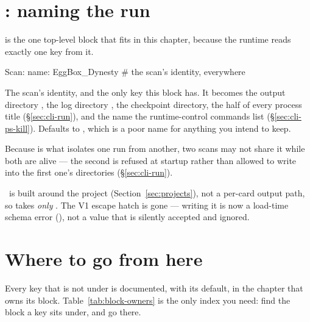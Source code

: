 \section{: naming the run}
\label{sec:scan-block}

 is the one top-level block that fits in this chapter, because the runtime
reads exactly one key from it.

\begin{yamlwin}
Scan:
  name: EggBox_Dynesty          # the scan's identity, everywhere
\end{yamlwin}

\begin{keylist}
  \item[name] The scan's identity, and the only key this block has. It becomes the output
        directory , the log directory , the
        checkpoint directory, the  half of every process title
        (\S\ref{sec:cli-run}), and the name the runtime-control commands list
        (\S\ref{sec:cli-ps-kill}). Defaults to , which is a poor name for
        anything you intend to keep.
\end{keylist}

Because  is what isolates one run from another, two scans may not
share it while both are alive --- the second is refused at startup rather than allowed to
write into the first one's directories (\S\ref{sec:cli-run}).

\begin{jnote}
\Jtwo\ is built around the project (Section~\ref{sec:projects}), not a per-card output
path, so  takes \emph{only} . The V1 
escape hatch is gone --- writing it is now a load-time schema error
(), not a value that is silently accepted and ignored.
\end{jnote}

\section{Where to go from here}
\label{sec:part2-map}

Every key that is not under  is documented, with its default, in the chapter
that owns its block. Table~\ref{tab:block-owners} is the only index you need: find the
block a key sits
under, and go there.

